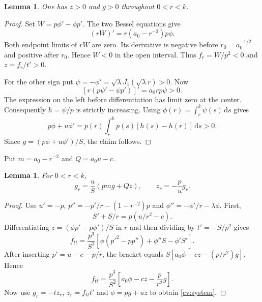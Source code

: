 \documentclass[11pt,letterpaper,reqno]{amsart}
\newtheorem{lemma}[theorem]{Lemma}
\theoremstyle{definition}
\newcommand{\dd}{\,\mathrm d}
\begin{document}
\begin{lemma}
One has $z>0$ and $g>0$ throughout $0<r<k$.
\end{lemma}
\begin{proof}
Set $W=p\phi'-\phi p'$. The two Bessel equations give
\[
 (rW)'=r(a_0-r^{-2})p\phi.
\]
Both endpoint limits of $rW$ are zero. Its derivative is negative
before $r_0=a_0^{-1/2}$ and positive after $r_0$. Hence $W<0$ in
the open interval. Thus $f_r=W/p^2<0$ and $z=f_r/t'>0$.

For the other sign put $\psi=-\phi'=\sqrt\lambda
J_1(\sqrt\lambda r)>0$. Now
\[
 [r(p\psi'-\psi p')]'=a_0rp\psi>0.
\]
The expression on the left before differentiation has limit zero
at the center. Consequently $h=\psi/p$ is strictly increasing.
Using $\phi(r)=\int_r^k\psi(s)\dd s$ gives
\[
 p\phi+u\phi'
 =p(r)\int_r^k p(s)[h(s)-h(r)]\dd s>0.
\]
Since $g=(p\phi+u\phi')/S$, the claim follows.
\end{proof}

Put $m=a_0-r^{-2}$ and $Q=a_0u-c$.
\begin{lemma}
For $0<r<k$,
\begin{equation}\label{cv:system}
 g_r=\frac{u}{S}(pmg+Qz),\qquad z_r=-\frac pu g_r.
\end{equation}
\end{lemma}
\begin{proof}
Use $u'=-p$, $p''=-p'/r-(1-r^{-2})p$ and
$\phi''=-\phi'/r-\lambda\phi$. First,
\[
 S'+S/r=p(u/r^2-c).
\]
Differentiating $z=(\phi p'-p\phi')/S$ in $r$ and then dividing by
$t'=-S/p^2$ gives
\[
 f_{tt}=\frac{p^3}{S^3}
 \left[\phi(p'^2-pp'')+\phi''S-\phi'S'\right].
\]
After inserting $p'=u-c-p/r$, the bracket equals
$S[a_0\phi-cz-(p/r^2)g]$. Hence
\[
 f_{tt}=\frac{p^3}{S^2}
       \left[a_0\phi-cz-\frac p{r^2}g\right].
\]
Now use $g_r=-tz_r$, $z_r=f_{tt}t'$ and $\phi=pg+uz$ to obtain
\eqref{cv:system}.
\end{proof}
\end{document}
